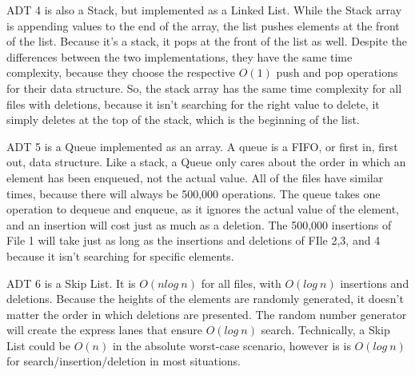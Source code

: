 \documentclass[12pt]{article}
\begin{document}
\begin{doublespace}
    ADT 4 is also a Stack, but implemented as a Linked List. While the Stack array is appending values to the end of the array, the list pushes elements at the front of the list. Because it's a stack, it pops at the front of the list as well. Despite the differences between the two implementations, they have the same time complexity, because they choose the respective $O(1)$ push and pop operations for their data structure. So, the stack array has the same time complexity for all files with deletions, because it isn't searching for the right value to delete, it simply deletes at the top of the stack, which is the beginning of the list. 

    ADT 5 is a Queue implemented as an array. A queue is a FIFO, or first in, first out, data structure. Like a stack, a Queue only cares about the order in which an element has been enqueued, not the actual value. All of the files have similar times, because there will always be 500,000 operations. The queue takes one operation to dequeue and enqueue, as it ignores the actual value of the element, and an insertion will cost just as much as a deletion. The 500,000 insertions of File 1 will take just as long as the insertions and deletions of FIle 2,3, and 4 because it isn't searching for specific elements.

    ADT 6 is a Skip List. It is $O(nlog\:n)$ for all files, with $O(log\:n)$ insertions and deletions. Because the heights of the elements are randomly generated, it doesn't matter the order in which deletions are presented. The random number generator will create the express lanes that ensure $O(log\:n)$ search. Technically, a Skip List could be $O(n)$ in the absolute worst-case scenario, however is is $O(log\:n)$ for search/insertion/deletion in most situations.
 


\end{doublespace}
\end{document}
